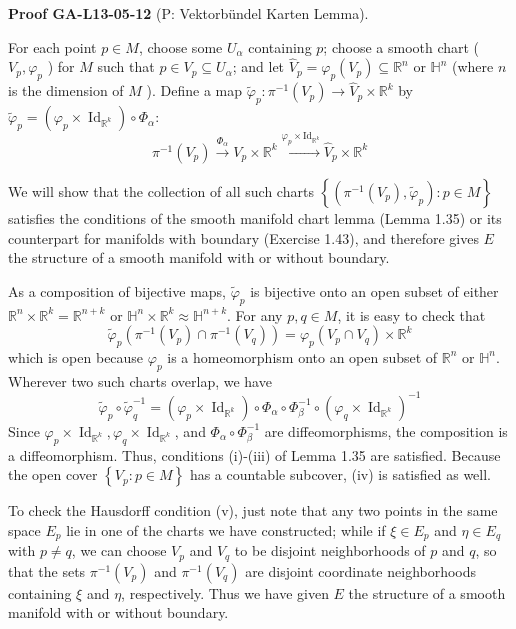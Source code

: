 \documentclass[10pt, letterpaper]{article}
\newcommand{\CustomHeading}[3]{%
  \par\medskip\noindent%
  \textbf{#1 #2} \textnormal{(#3)}.\enskip%
}
\newenvironment{PROOF}[2]{\begin{unitbox}\CustomHeading{Proof}{#1}{#2}}{\end{unitbox}}
\begin{document}
\begin{PROOF}{GA-L13-05-12}{P: Vektorbündel Karten Lemma}
For each point $p \in M$, choose some $U_\alpha$ containing $p$; choose a smooth chart ( $V_p, \varphi_p$ ) for $M$ such that $p \in V_p \subseteq U_\alpha$; and let $\widehat{V}_p=\varphi_p\left(V_p\right) \subseteq \mathbb{R}^n$ or $\mathbb{H}^n$ (where $n$ is the dimension of $M$ ). Define a map $\tilde{\varphi}_p: \pi^{-1}\left(V_p\right) \rightarrow \widehat{V}_p \times \mathbb{R}^k$ by $\tilde{\varphi}_p=\left(\varphi_p \times \operatorname{Id}_{\mathbb{R}^k}\right) \circ \Phi_{\alpha}$:
$$
\pi^{-1}\left(V_{p}\right) \xrightarrow{\Phi_{\alpha}} V_{p} \times \mathbb{R}^{k} \xrightarrow{\varphi_{p} \times \mathrm{Id}_{\mathbb{R}^{k}}} \widehat{V}_{p} \times \mathbb{R}^{k}
$$

We will show that the collection of all such charts $\left\{\left(\pi^{-1}\left(V_{p}\right), \widetilde{\varphi}_{p}\right): p \in M\right\}$ satisfies the conditions of the smooth manifold chart lemma (Lemma 1.35) or its counterpart for manifolds with boundary (Exercise 1.43), and therefore gives $E$ the structure of a smooth manifold with or without boundary.

As a composition of bijective maps, $\widetilde{\varphi}_{p}$ is bijective onto an open subset of either $\mathbb{R}^{n} \times \mathbb{R}^{k}=\mathbb{R}^{n+k}$ or $\mathbb{H}^{n} \times \mathbb{R}^{k} \approx \mathbb{H}^{n+k}$. For any $p, q \in M$, it is easy to check that
$$
\widetilde{\varphi}_{p}\left(\pi^{-1}\left(V_{p}\right) \cap \pi^{-1}\left(V_{q}\right)\right)=\varphi_{p}\left(V_{p} \cap V_{q}\right) \times \mathbb{R}^{k}
$$
which is open because $\varphi_{p}$ is a homeomorphism onto an open subset of $\mathbb{R}^{n}$ or $\mathbb{H}^{n}$. Wherever two such charts overlap, we have
$$
\widetilde{\varphi}_{p} \circ \widetilde{\varphi}_{q}^{-1}=\left(\varphi_{p} \times \operatorname{Id}_{\mathbb{R}^{k}}\right) \circ \Phi_{\alpha} \circ \Phi_{\beta}^{-1} \circ\left(\varphi_{q} \times \operatorname{Id}_{\mathbb{R}^{k}}\right)^{-1}
$$
Since $\varphi_{p} \times \operatorname{Id}_{\mathbb{R}^{k}}, \varphi_{q} \times \operatorname{Id}_{\mathbb{R}^{k}}$, and $\Phi_{\alpha} \circ \Phi_{\beta}^{-1}$ are diffeomorphisms, the composition is a diffeomorphism. Thus, conditions (i)-(iii) of Lemma 1.35 are satisfied. Because the open cover $\left\{V_{p}: p \in M\right\}$ has a countable subcover, (iv) is satisfied as well.

To check the Hausdorff condition (v), just note that any two points in the same space $E_{p}$ lie in one of the charts we have constructed; while if $\xi \in E_{p}$ and $\eta \in E_{q}$ with $p \neq q$, we can choose $V_{p}$ and $V_{q}$ to be disjoint neighborhoods of $p$ and $q$, so that the sets $\pi^{-1}\left(V_{p}\right)$ and $\pi^{-1}\left(V_{q}\right)$ are disjoint coordinate neighborhoods containing $\xi$ and $\eta$, respectively. Thus we have given $E$ the structure of a smooth manifold with or without boundary.


\end{PROOF}
\end{document}

